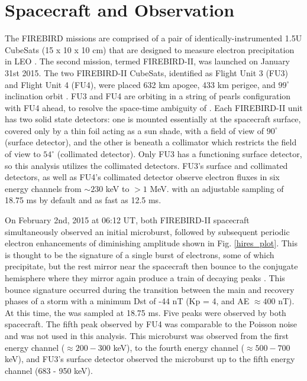 \documentclass[draft, linenumbers]{agujournal}
\begin{document}
\section{Spacecraft and Observation} \label{obs} %
The FIREBIRD missions are comprised of a pair of identically-instrumented 1.5U CubeSats (15 x 10 x 10 cm) that are designed to measure electron precipitation in LEO \citep{Spence2012, Klumpar2015}. The second mission, termed FIREBIRD-II, was launched on January 31st 2015.  The two FIREBIRD-II CubeSats, identified as Flight Unit 3 (FU3) and Flight Unit 4 (FU4), were placed  632 km apogee, 433 km perigee, and $99^{\circ}$ inclination orbit \citep{Crew2016}. FU3 and FU4 are orbiting in a string of pearls configuration with FU4 ahead, to resolve the space-time ambiguity of . Each FIREBIRD-II unit has two solid state detectors: one is mounted essentially at the spacecraft surface, covered only by a thin foil acting as a sun shade, with a field of view of $90^{\circ}$ (surface detector), and the other is beneath a collimator which restricts the field of view to $54^{\circ}$ (collimated detector). Only FU3 has a functioning surface detector, so this analysis utilizes the collimated detectors. FU3's surface and collimated detectors, as well as FU4's collimated detector observe electron fluxes in six energy channels from $\sim 230$ keV to $> 1$ MeV.  with an adjustable sampling  of 18.75 ms by default and  as fast as 12.5 ms. 

On February 2nd, 2015 at 06:12 UT, both FIREBIRD-II spacecraft simultaneously observed an initial microburst, followed by subsequent periodic electron enhancements of diminishing amplitude shown in Fig. \ref{hires_plot}. This is thought to be the signature of a single burst of electrons, some of which precipitate, but the rest mirror near the spacecraft then bounce to the conjugate hemisphere where they mirror again  produce a train of decaying peaks \citep{Blake1996, Thorne2005}. This bounce signature occurred during the transition between the main and recovery phases of a storm with a minimum Dst of -44 nT (Kp = 4, and AE ${\approx 400}$ nT). At this time, the  was sampled at 18.75 ms. Five peaks were observed by both spacecraft. The fifth peak observed by FU4 was comparable to the Poisson noise and was not used in this analysis. This microburst was observed from the first energy channel ($\approx 200-300$ keV), to the fourth energy channel ($\approx 500-700$ keV), and FU3's surface detector observed the microburst up to the fifth energy channel (683 - 950 keV). 
\end{document}
